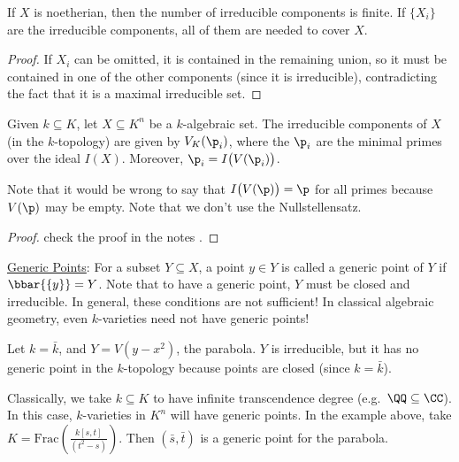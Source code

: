  \begin{theorem}
   If $X$ is noetherian, then the number of irreducible components is finite. If
   $\{X_i\}$ are the irreducible components, all of them are needed to cover $X$.
 \end{theorem}
 \begin{proof}
   If $X_i$ can be omitted, it is contained in the remaining union, so it must be
   contained in one of the other components (since it is irreducible), contradicting the
   fact that it is a maximal irreducible set.

   \anton{}
 \end{proof}
 \begin{theorem}
   Given $k\subseteq K$, let $X\subseteq K^n$ be a $k$-algebraic set. The irreducible
   components of $X$ (in the $k$-topology) are given by $V_K(\p_i)$, where the $\p_i$
   are the minimal primes over the ideal $I(X)$. Moreover, $\p_i=I\bigl(V(\p_i)\bigr)$.
 \end{theorem}
 Note that it would be wrong to say that $I\bigl(V(\p)\bigr)=\p$ for all primes because
 $V(\p)$ may be empty. Note that we don't use the Nullstellensatz.
 \begin{proof}
   check the proof in the notes \anton{}.
 \end{proof}

 \underline{Generic Points}: For a subset $Y\subseteq X$, a point $y\in Y$ is called a
 generic point of $Y$ if $\bbar{\{y\}}=Y$. Note that to have a generic point, $Y$ must be
 closed and irreducible. In general, these conditions are not sufficient! In classical
 algebraic geometry, even $k$-varieties need not have generic points!
 \begin{example}
   Let $k=\bar k$, and $Y=V(y-x^2)$, the parabola. $Y$ is irreducible, but it has no
   generic point in the $k$-topology because points are closed (since $k=\bar k$).
 \end{example}
 Classically, we take $k\subseteq K$ to have infinite transcendence degree (e.g.\
 $\QQ\subseteq \CC$). In this case, $k$-varieties in $K^n$ will have generic points. In
 the example above, take $K=\text{Frac}\left(\frac{k[s,t]}{(t^2-s)}\right)$. Then $(\bar
 s, \bar t)$ is a generic point for the parabola.

